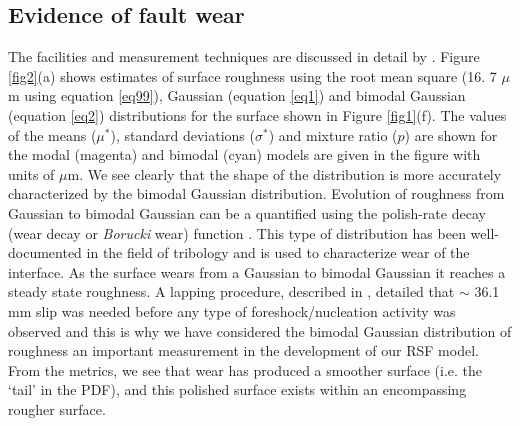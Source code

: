 \documentclass[preprint,1p, 10pt,authoryear]{elsarticle}
\begin{document}
\subsection{Evidence of fault wear}
\label{SurfaceWear}
The facilities and measurement techniques are discussed in detail by \citet{Selvadurai2017}.  Figure \ref{fig2}(a) shows estimates of surface roughness using the root mean square (16. 7 $\mu$m using equation \eqref{eq99}), Gaussian (equation \eqref{eq1}) and bimodal Gaussian (equation \eqref{eq2}) distributions for the surface shown in Figure \ref{fig1}(f). The values of the means ($\mu^{*}$), standard deviations ($\sigma^{*}$) and mixture ratio ($p$) are shown for the modal (magenta) and bimodal (cyan) models are given in the figure with units of $\mu$m.  We see clearly that the shape of the distribution is more accurately characterized by the bimodal Gaussian distribution.  Evolution of roughness from Gaussian to bimodal Gaussian can be a quantified using the polish-rate decay (wear decay or \textit{Borucki} wear) function \citep{Borucki2002, Borucki2004, Ciavarella2016}. This type of distribution has been well-documented in the field of tribology and is used to characterize wear of the interface. As the surface wears from a Gaussian to bimodal Gaussian it reaches a steady state roughness.  A lapping procedure, described in \citet{Selvadurai2015}, detailed that $\sim$ 36.1 mm slip was needed before any type of foreshock/nucleation activity was observed and this is why we have considered the bimodal Gaussian distribution of roughness an important measurement in the development of our RSF model.  From the metrics, we see that wear has produced a smoother surface (i.e.  the `tail' in the PDF), and this polished surface exists within an encompassing rougher surface.     
\end{document}
